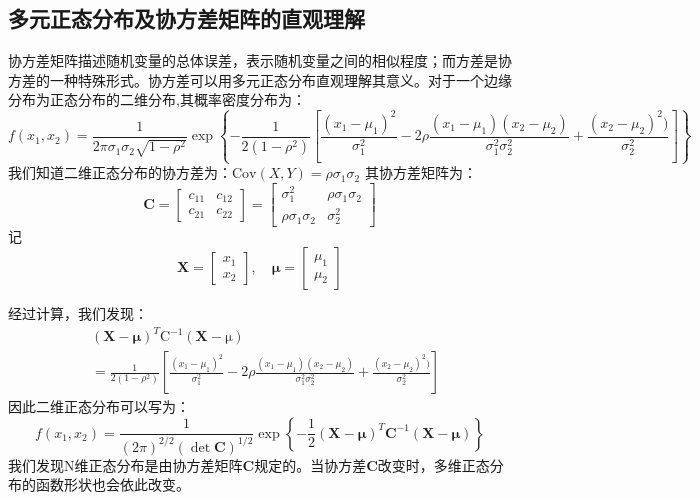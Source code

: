 \subsection{多元正态分布及协方差矩阵的直观理解}
协方差矩阵描述随机变量的总体误差，表示随机变量之间的相似程度；而方差是协方差的一种特殊形式。协方差可以用多元正态分布直观理解其意义。对于一个边缘分布为正态分布的二维分布,其概率密度分布为：
\begin{equation}
    f(x_1,x_2)=\frac{1}{2\pi\sigma_1\sigma_2\sqrt{1-\rho^2}}\exp
    \left\{ -\frac{1}{2(1-\rho^2)}\left[\frac{(x_1-\mu_1)^2}{\sigma^2_1}-2\rho\frac{(x_1-\mu_1)(x_2-\mu_2)}{\sigma_1^2\sigma_2^2}+\frac{(x_2-\mu_2)^2)}{\sigma^2_2}\right] \right\}
\end{equation}
我们知道二维正态分布的协方差为：$\mathrm{Cov}(X,Y)=\rho \sigma_1\sigma_2$
其协方差矩阵为：
$$\mathbf{C}=\left[
    \begin{matrix}
        c_{11} & c_{12} \\
        c_{21} & c_{22}
        \end{matrix}\right]=\left[
    \begin{matrix}
        \sigma_1^2 & \rho\sigma_1\sigma_2 \\
        \rho\sigma_1\sigma_2 & \sigma_2^2
    \end{matrix}
\right]$$
记$$\mathbf{X}=\left[
    \begin{matrix}
        x_1 \\
        x_2
    \end{matrix}\right],\quad
    \mathbf{\mu}=\left[
        \begin{matrix}
            \mu_1 \\
            \mu_2
        \end{matrix}\right]$$
    
经过计算，我们发现：
$$\begin{aligned}
    &(\mathbf{X}-\mathbf{\mu})^T \mathrm{C}^{-1}(\mathbf{X}-\mathrm{\mu})\\
    &=\frac{1}{2(1-\rho^2)}\left[\frac{(x_1-\mu_1)^2}{\sigma^2_1}-2\rho\frac{(x_1-\mu_1)(x_2-\mu_2)}{\sigma_1^2\sigma_2^2}+\frac{(x_2-\mu_2)^2)}{\sigma^2_2}\right] 
\end{aligned}$$
因此二维正态分布可以写为：
$$f(x_1,x_2)=\frac{1}{(2\pi)^{2/2}(\det\mathbf{C})^{1/2}}\exp\left\{
    -\frac{1}{2}(\mathbf{X}-\mathbf{\mu})^T \mathbf{C}^{-1}(\mathbf{X}-\mathbf{\mu})
\right\}$$
我们发现N维正态分布是由协方差矩阵$\mathbf{C}$规定的。当协方差$\mathbf{C}$改变时，多维正态分布的函数形状也会依此改变。

